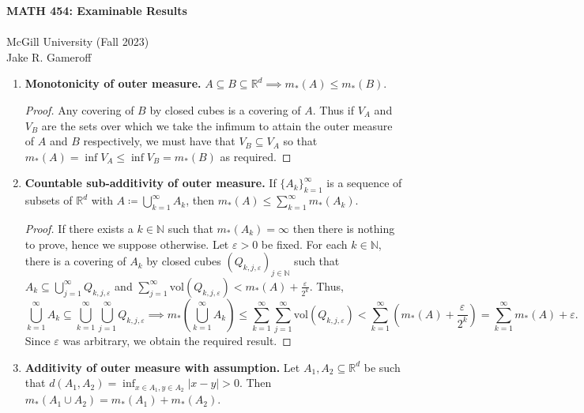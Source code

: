 
\usepackage{todonotes}


\begin{center}
	\textbf{\large MATH 454: Examinable Results} \\
    \\ \large McGill University (Fall 2023)
    \\ Jake R. Gameroff 
\end{center}
\begin{enumerate}
	\item \textbf{Monotonicity of outer measure.} \( A \subseteq B \subseteq \mathbb{R}^{d} \implies m_*(A) \leq m_*(B).\) 
		\begin{proof}\renewcommand{\qedsymbol}{}
		Any covering of \( B \) by closed cubes is a covering of \( A \). Thus if \( V_A \) and \( V_B \) are the sets over which we take the infimum to attain the outer measure of \( A \) and \( B \) respectively, we must have that \( V_B \subseteq V_A \) so that \(m_*(A) = \inf V_A \leq \inf V_B = m_*(B) \) as required.
	        \end{proof}
	\item \textbf{Countable sub-additivity of outer measure.} If \( \{ A_k \}_{k=1} ^{\infty}  \) is a sequence of subsets of \( \mathbb{R}^{d}  \) with \(A \coloneqq \bigcup_{k=1}^{\infty} A_k \), then \( m_*(A) \leq \sum_{k=1}^{\infty}m_*(A_k)   \).
	\begin{proof}\renewcommand{\qedsymbol}{}
	If there exists a \( k \in \mathbb{N}  \) such that \( m_*(A_k) = \infty \) then there is nothing to prove, hence we suppose otherwise. Let \( \varepsilon > 0 \) be fixed. For each \( k \in \mathbb{N}  \), there is a covering of \( A_k \) by closed cubes \( (Q_{k,j,\varepsilon })_{j \in \mathbb{N} }   \) such that \( A_k \subseteq \bigcup_{j=1}^{\infty} Q_{k,j,\varepsilon }  \) and \( \sum_{j=1}^{\infty}\mbox{vol}(Q_{k,j,\varepsilon } ) < m_*(A) + \frac{\varepsilon }{2^{k} }  \). Thus, \[\bigcup_{k=1}^{\infty} A_k \subseteq \bigcup_{k=1}^{\infty} \bigcup_{j=1}^{\infty} Q_{k,j,\varepsilon } \implies m_*\left ( {\bigcup_{k=1}^{\infty} A_k} \right ) \leq \sum_{k=1}^{\infty}\sum_{j=1}^{\infty} \mbox{vol}(Q_{k,j,\varepsilon } ) < \sum_{k=1}^{\infty} \left(m_*(A) + \frac{\varepsilon }{2^{k} } \right)  = \sum_{k=1}^{\infty}m_*(A) + \varepsilon .  \] Since \( \varepsilon  \) was arbitrary, we obtain the required result.
\end{proof}
\item \textbf{Additivity of outer measure with assumption.} Let \( A_1, A_2 \subseteq \mathbb{R}^{d}  \) be such that \( d(A_1, A_2) = \inf_{x \in A_1, y \in A_2}|x-y|  > 0 \). Then \( m_*(A_1 \cup A_2) = m_*(A_1) + m_*(A_2)   \).

\end{enumerate}
